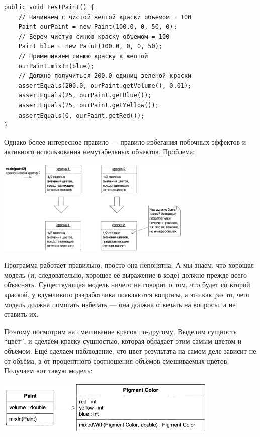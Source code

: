 \documentclass[a5paper]{article}
\begin{document}
\begin{verbatim}
public void testPaint() {
    // Начинаем с чистой желтой краски объемом = 100
    Paint ourPaint = new Paint(100.0, 0, 50, 0);
    // Берем чистую синюю краску объемом = 100
    Paint bluе = new Paint(100.0, 0, 0, 50);
    // Примешиваем синюю краску к желтой
    ourPaint.mixIn(blue); 
    // Должно получиться 200.0 единиц зеленой краски
    assertEquals(200.0, ourPaint.getVolume(), 0.01);
    assertEquals(25, ourPaint.getBlue());
    assertEquals(25, ourPaint.getYellow());
    assertEquals(0, ourPaint.getRed());
}
\end{verbatim}

Однако более интересное правило --- правило избегания побочных эффектов и активного использования немутабельных объектов. Проблема:

\begin{center}
    \includegraphics[width=0.7\textwidth]{mixinSideEffects.png}
\end{center}

Программа работает правильно, просто она непонятна. А мы знаем, что хорошая модель (и, следовательно, хорошее её выражение в коде) должно прежде всего объяснять. Существующая модель ничего не говорит о том, что будет со второй краской, у вдумчивого разработчика появляются вопросы, а это как раз то, чего модель должна помогать избегать --- она должна отвечать на вопросы, а не ставить их.

Поэтому посмотрим на смешивание красок по-другому. Выделим сущность ``цвет'', и сделаем краску сущностью, которая обладает этим самым цветом и объёмом. Ещё сделаем наблюдение, что цвет результата на самом деле зависит не от объёма, а от процентного соотношения объёмов смешиваемых цветов. Получаем вот такую модель:

\begin{center}
    \includegraphics[width=0.8\textwidth]{pigmentColor.png}
\end{center}
\end{document}
